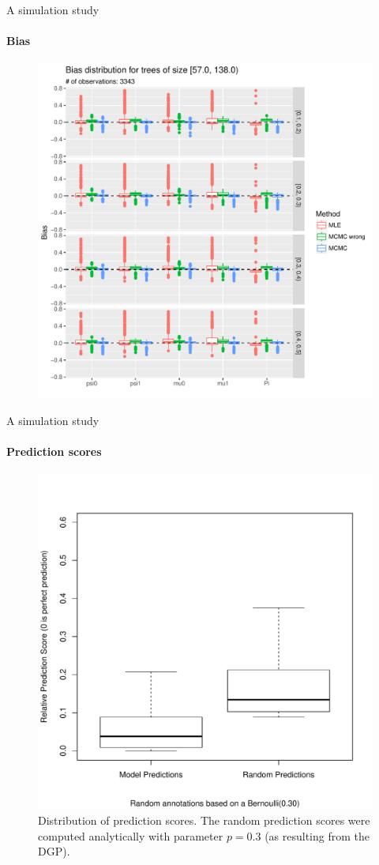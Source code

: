 \documentclass[9pt,ignorenonframetext,]{beamer}
\begin{document}
\begin{frame}[t]{A simulation study}

\framesubtitle{Bias}

\begin{figure}
\centering
\includegraphics[width=.68\linewidth]{bias_trees_of_size_[57,138).pdf}
\end{figure}

\end{frame}

\begin{frame}[t]{A simulation study}

\framesubtitle{Prediction scores}

\begin{figure}
\centering
\includegraphics[width=.6\linewidth, trim = {0 1cm 0 2cm}, clip]{mcmc_right_prior_prediction.pdf}
\caption{Distribution of prediction scores. The random prediction scores were computed analytically with parameter $p=0.3$ (as resulting from the DGP).}
\end{figure}

\end{frame}
\end{document}
